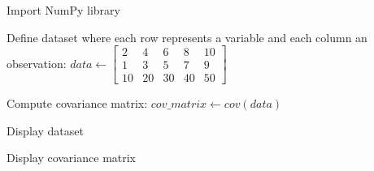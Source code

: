 \begin{algorithm}
\caption{Compute Covariance Matrix of a Dataset using NumPy}
\begin{algorithmic}[1]

\STATE Import NumPy library

\STATE Define dataset where each row represents a variable and each column an observation:
\STATE $data \gets \begin{bmatrix}
2 & 4 & 6 & 8 & 10 \\
1 & 3 & 5 & 7 & 9 \\
10 & 20 & 30 & 40 & 50
\end{bmatrix}$

\STATE Compute covariance matrix:
\STATE $cov\_matrix \gets cov(data)$

\STATE Display dataset

\STATE Display covariance matrix

\end{algorithmic}
\end{algorithm}